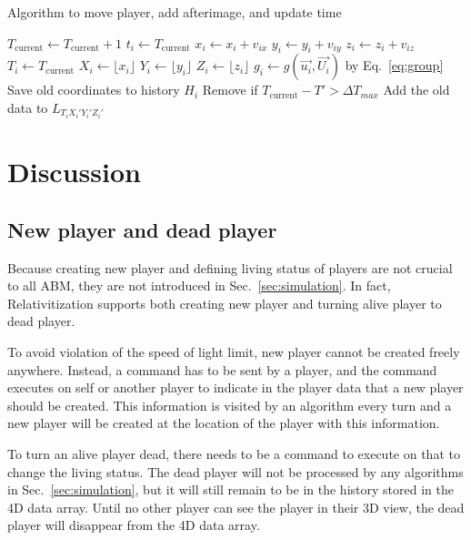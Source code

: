 \documentclass{article}
\begin{document}
\begin{algorithm}
\caption{Algorithm to move player, add afterimage, and update time}
\label{alg:move}
\begin{algorithmic}[1]
  \State $T_{\textrm{current}} \gets T_{\textrm{current}} + 1$
    \State $t_i \gets T_{\textrm{current}}$
    \State $x_i \gets x_i + v_{ix}$
    \State $y_i \gets y_i + v_{iy}$
    \State $z_i \gets z_i + v_{iz}$
    \State $T_i \gets T_{\textrm{current}}$
    \State $X_i \gets \lfloor x_i \rfloor$
    \State $Y_i \gets \lfloor y_i \rfloor$
    \State $Z_i \gets \lfloor z_i \rfloor$
    \State $g_i \gets g(\overrightarrow{u_i}, \overrightarrow{U_i})$ by Eq.~\ref{eq:group}
      \State Save old coordinates to history $H_i$
    \EndIf
      \State Remove if $T_{\textrm{current}} - T' > \Delta T_{max}$
    \EndFor
      \State Add the old data to $L_{T_i X_i' Y_i' Z_i'}$
    \EndFor
  \EndFor
\end{algorithmic}
\end{algorithm}

\section{Discussion}

\subsection{New player and dead player}

Because creating new player and defining living status of players are not crucial to all ABM,
they are not introduced in Sec.~\ref{sec:simulation}.
In fact, Relativitization supports both creating new player and turning alive player to dead player.

To avoid violation of the speed of light limit, new player cannot be created freely anywhere.
Instead, a command has to be sent by a player, and the command executes on self or another player
to indicate in the player data that a new player should be created.
This information is visited by an algorithm every turn and a new player will be created at the location
of the player with this information.

To turn an alive player dead, there needs to be a command to execute on that to change the living status.
The dead player will not be processed by any algorithms in Sec.~\ref{sec:simulation}, but it will still
remain to be in the history stored in the 4D data array. Until no other player can see the player in their 3D view,
the dead player will disappear from the 4D data array.
\end{document}
